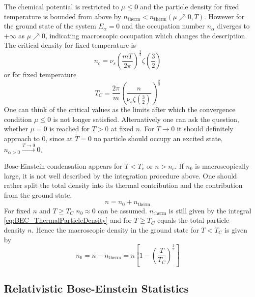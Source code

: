 The chemical potential is restricted to $\mu\leq 0$ and the particle density for fixed temperature is bounded from above by $n_{\text{therm}}<n_{\text{therm}}(\mu\nearrow 0,T)$. However for the ground state of the system $E_\alpha=0$ and the occupation number $n_\alpha$ diverges to $+\infty$ as $\mu\nearrow 0$, indicating macroscopic occupation which changes the description. The critical density for fixed temperature is
\begin{equation}
    n_c=\nu_s\left(\frac{mT}{2\pi}\right)^\frac{3}{2}\zeta(\frac{3}{2})
\end{equation}
or for fixed temperature
\begin{equation}
    T_C=\frac{2\pi}{m}\left(\frac{n}{\nu_s\zeta(\frac{3}{2})}\right)^\frac{2}{3}
\end{equation}
One can think of the critical values as the limits after which the convergence condition $\mu\leq 0$ is not longer satisfied. Alternatively one can ask the question, whether $\mu=0$ is reached for $T>0$ at fixed $n$. For $T\to 0$ it should definitely approach to $0$, since at $T=0$ no particle should occupy an excited state, $n_{\alpha>0}\overset{T\to 0}{\to}0$.

Bose-Einstein condensation appears for $T<T_c$ or $n>n_c$. If $n_0$ is macroscopically large, it is not well described by the integration procedure above. One should rather split the total density into its thermal contribution and the contribution from the ground state,
\begin{equation}
    n=n_0+n_{\text{therm}}
\end{equation}
For fixed $n$ and $T\geq T_C$ $n_0\approx 0$ can be assumed. $n_{\text{therm}}$ is still given by the integral \eqref{eq:BEC_ThermalParticleDensity} and for $T\geq T_C$ equals the total particle density $n$. Hence the macroscopic density in the ground state for $T<T_C$ is given by
\begin{equation}
    n_0=n-n_{\text{therm}}=n\left[1-\left(\frac{T}{T_C}\right)^\frac{3}{2}\right]
\end{equation}

\subsection{Relativistic Bose-Einstein Statistics}

